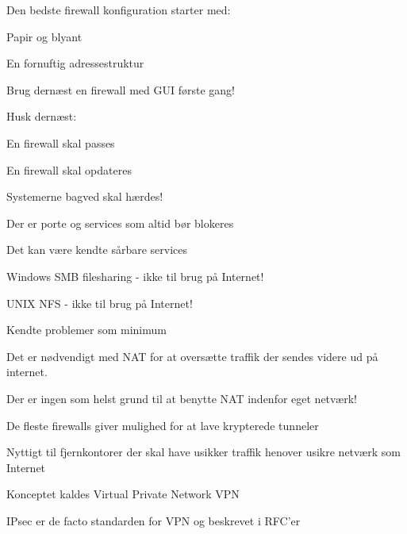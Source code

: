 \documentclass[Screen16to9,17pt]{foils}
\begin{document}

\begin{list1}
\item Den bedste firewall konfiguration starter med:
\begin{list2}
\item Papir og blyant
\item En fornuftig adressestruktur
\end{list2}
\item Brug dernæst en firewall med GUI første gang!
\item Husk dernæst:
\begin{list2}
\item En firewall skal passes
\item En firewall skal opdateres
\item Systemerne bagved skal hærdes!
\end{list2}
\end{list1}





\begin{list1}
\item Der er porte og services som altid bør blokeres
\item Det kan være kendte sårbare services
\begin{list2}
\item Windows SMB filesharing - ikke til brug på Internet!
\item UNIX NFS - ikke til brug på Internet!
\end{list2}
\item Kendte problemer som minimum
\end{list1}




\begin{list1}
\item Det er nødvendigt med NAT for at oversætte traffik der sendes videre
ud på internet.
\vskip 1cm
\item Der er ingen som helst grund til at benytte NAT indenfor eget netværk!
\end{list1}



\begin{list1}
\item De fleste firewalls giver mulighed for at lave krypterede
  tunneler
\item Nyttigt til fjernkontorer der skal have usikker traffik henover
  usikre netværk som Internet
\item Konceptet kaldes Virtual Private Network VPN
\item IPsec er de facto standarden for VPN og beskrevet i RFC'er
\end{list1}
\end{document}
